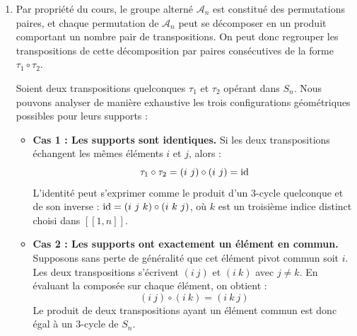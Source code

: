 \documentclass[12pt, a4paper]{report}
\begin{document}
\begin{enumerate}
\begin{itemize}
        \item Pour tout couple $(k,l) \in \mathcal{I}(\sigma^{-1})$, on a de la même manière :
        $$(f \circ g)(k,l) = f\bigl(g(k,l)\bigr) = f\bigl(\sigma^{-1}(l), \sigma^{-1}(k)\bigr)$$
        \item En appliquant la définition de $f$ sur le couple d'arguments $\bigl(\sigma^{-1}(l), \sigma^{-1}(k)\bigr)$, on obtient :
        $$f\bigl(\sigma^{-1}(l), \sigma^{-1}(k)\bigr) = \Bigl(\sigma\bigl(\sigma^{-1}(k)\bigr), \sigma\bigl(\sigma^{-1}(l)\bigr)\Bigr) = (k,l)$$
        \item On a donc $f \circ g = \Id_{\mathcal{I}(\sigma^{-1})}$.
    \end{itemize}

    L'application $f$ admet une application réciproque à gauche et à droite (qui est $g$). $f$ est donc une bijection. Cela implique l'égalité des cardinaux des ensembles de départ et d'arrivée, d'où :
    $$\mathrm{I}(\sigma) = I(\sigma^{-1})$$

    \item Par propriété du cours, le groupe alterné $\mathcal{A}_n$ est constitué des permutations paires, et chaque permutation de $\mathcal{A}_n$ peut se décomposer en un produit comportant un nombre pair de transpositions. On peut donc regrouper les transpositions de cette décomposition par paires consécutives de la forme $\tau_1 \circ \tau_2$.
    
    Soient deux transpositions quelconques $\tau_1$ et $\tau_2$ opérant dans $S_n$. Nous pouvons analyser de manière exhaustive les trois configurations géométriques possibles pour leurs supports :
    \begin{itemize}
        \item \textbf{Cas 1 : Les supports sont identiques.} Si les deux transpositions échangent les mêmes éléments $i$ et $j$, alors :
        $$\tau_1 \circ \tau_2 = (i \ j) \circ (i \ j) = \mathrm{id}$$
        L'identité peut s'exprimer comme le produit d'un $3$-cycle quelconque et de son inverse : $\Id = (i \ j \ k) \circ (i \ k \ j)$, où $k$ est un troisième indice distinct choisi dans $[\![1,n]\!]$.
        
        \item \textbf{Cas 2 : Les supports ont exactement un élément en commun.} Supposons sans perte de généralité que cet élément pivot commun soit $i$. Les deux transpositions s'écrivent $(i \ j)$ et $(i \ k)$ avec $j \neq k$. En évaluant la composée sur chaque élément, on obtient :
        $$(i \ j) \circ (i \ k) = (i \ k \ j)$$
        Le produit de deux transpositions ayant un élément commun est donc égal à un $3$-cycle de $S_n$.
        

\end{itemize}
\end{enumerate}
\end{document}

